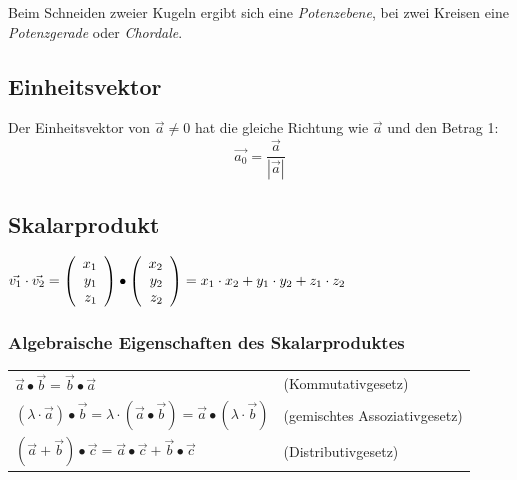 		Beim Schneiden zweier Kugeln ergibt sich eine \textit{Potenzebene}, bei zwei Kreisen eine
		\textit{Potenzgerade} oder \textit{Chordale}.



\subsection{Einheitsvektor}
	Der Einheitsvektor von $\vec{a} \neq 0$ hat die gleiche Richtung wie $\vec{a}$ und den Betrag 1:
	\begin{equation*}
		\vec{a_0} = \frac{\vec{a}}{|\vec{a}|}
	\end{equation*}
	
\newpage
\subsection{Skalarprodukt}
	$\vec{v_1} \cdot \vec{v_2} = \left(\begin{array}{r} x_1 \\ y_1 \\ z_1 \\ \end{array}\right) \bullet \left(\begin{array}{r} x_2 \\ y_2 \\ z_2 \\ \end{array}\right)= x_1\cdot x_2 + y_1\cdot y_2 + z_1\cdot z_2$
	
	\subsubsection{Algebraische Eigenschaften des Skalarproduktes}
		\begin{tabular}{ll}
			$\vec{a} \bullet \vec{b} = \vec{b} \bullet \vec{a}$ & (Kommutativgesetz)\\
			$(\lambda \cdot \vec{a}) \bullet \vec{b} = \lambda \cdot (\vec{a} \bullet \vec{b}) = \vec{a} \bullet (\lambda \cdot \vec{b})$ & (gemischtes Assoziativgesetz)\\
			$(\vec{a} + \vec{b}) \bullet \vec{c} = \vec{a} \bullet \vec{c} + \vec{b} \bullet \vec{c}$ & (Distributivgesetz)
		\end{tabular}


